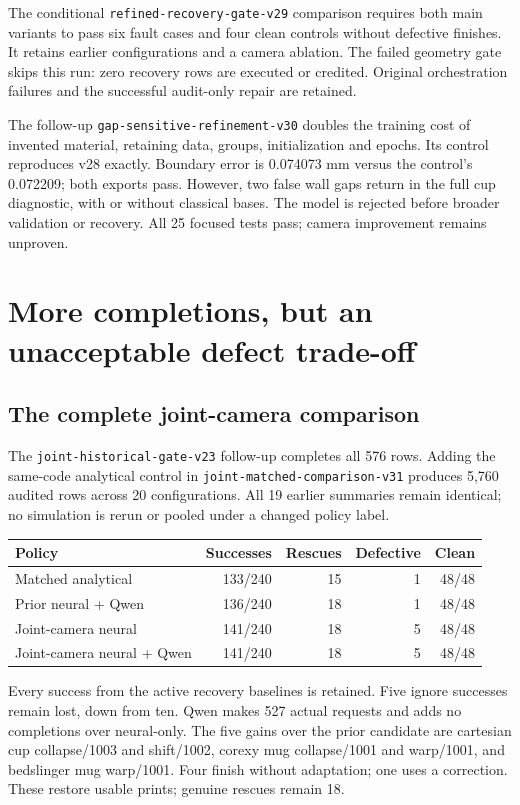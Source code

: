 \documentclass[10pt,letterpaper]{article}
\begin{document}
The conditional \texttt{refined-recovery-gate-v29} comparison requires both main
variants to pass six fault cases and four clean controls without defective
finishes. It retains earlier configurations and a camera ablation. The failed
geometry gate skips this run: zero recovery rows are executed or credited.
Original orchestration failures and the successful audit-only repair are retained.

The follow-up \texttt{gap-sensitive-refinement-v30} doubles the training cost of
invented material, retaining data, groups, initialization and epochs. Its control
reproduces v28 exactly. Boundary error is 0.074073 mm versus the control's 0.072209;
both exports pass. However, two false wall gaps return in the full cup diagnostic,
with or without classical bases. The model is rejected before broader validation
or recovery. All 25 focused tests pass; camera improvement remains unproven.

\clearpage
\section{More completions, but an unacceptable defect trade-off}

\subsection*{The complete joint-camera comparison}
The \texttt{joint-historical-gate-v23} follow-up completes all 576 rows. Adding
the same-code analytical control in \texttt{joint-matched-comparison-v31} produces
5,760 audited rows across 20 configurations. All 19 earlier summaries remain
identical; no simulation is rerun or pooled under a changed policy label.

\begin{center}
\begin{tabular}{@{}lrrrr@{}}
\toprule
Policy & Successes & Rescues & Defective & Clean \\
\midrule
Matched analytical & 133/240 & 15 & 1 & 48/48 \\
Prior neural + Qwen & 136/240 & 18 & 1 & 48/48 \\
Joint-camera neural & 141/240 & 18 & 5 & 48/48 \\
Joint-camera neural + Qwen & 141/240 & 18 & 5 & 48/48 \\
\bottomrule
\end{tabular}
\end{center}

Every success from the active recovery baselines is retained. Five ignore
successes remain lost, down from ten. Qwen makes 527 actual requests and adds
no completions over neural-only. The five gains over the prior candidate are
cartesian cup collapse/1003 and shift/1002, corexy mug collapse/1001 and warp/1001,
and bedslinger mug warp/1001. Four finish without adaptation; one uses a
correction. These restore usable prints; genuine rescues remain 18.
\end{document}
